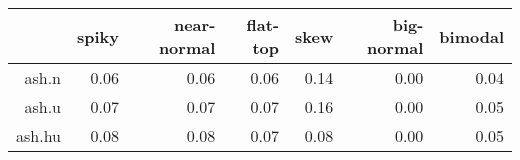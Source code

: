 \begin{tabular}{rrrrrrr}
  \toprule  & spiky & near-normal & flat-top & skew & big-normal & bimodal \\ 
  \midrule ash.n & 0.06 & 0.06 & 0.06 & 0.14 & 0.00 & 0.04 \\ 
  ash.u & 0.07 & 0.07 & 0.07 & 0.16 & 0.00 & 0.05 \\ 
  ash.hu & 0.08 & 0.08 & 0.07 & 0.08 & 0.00 & 0.05 \\ 
   \bottomrule \end{tabular}

